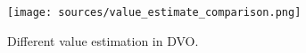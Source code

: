 \begin{figure}[t]
    \centering\small
    \setlength{\abovecaptionskip}{6pt}  
    \texttt{[image: sources/value\_estimate\_comparison.png]}
    \caption{Different value estimation in DVO.}
    \label{fig:value_estimate_comparison}
    \vspace{-5pt}
\end{figure}
